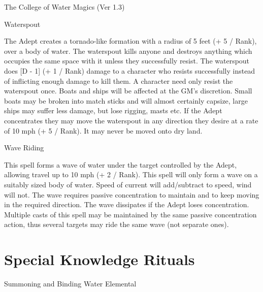 \begin{Chapter}{The College of Water Magics (Ver 1.3)}
\begin{spell}[S-14]{Waterspout}
\begin{effects}
The Adept creates a tornado-like formation with a radius of 5 feet (+
5 / Rank), over a body of water.  The waterspout kills anyone and
destroys anything which occupies the same space with it unless they
successfully resist.  The waterspout does [D - 1] (+ 1 / Rank) damage
to a character who resists successfully instead of inflicting enough
damage to kill them. A character need only resist the waterspout
once. Boats and ships will be affected at the GM’s discretion.  Small
boats may be broken into match sticks and will almost certainly
capsize, large ships may suffer less damage, but lose rigging, masts
etc.  If the Adept concentrates they may move the waterspout in any
direction they desire at a rate of 10 mph (+ 5 / Rank). It may never
be moved onto dry land.
\end{effects}
\end{spell}

\begin{spell}[S-15]{Wave Riding}

\begin{effects}
This spell forms a wave of water under the target controlled by the
Adept, allowing travel up to 10 mph (+ 2 / Rank). This spell will only
form a wave on a suitably sized body of water.  Speed of current will
add/subtract to speed, wind will not.  The wave requires passive
concentration to maintain and to keep moving in the required
direction.  The wave dissipates if the Adept loses concentration.
Multiple casts of this spell may be maintained by the same passive
concentration action, thus several targets may ride the same wave (not
separate ones).
\end{effects}
\end{spell}


\section{Special Knowledge Rituals}

\begin{ritual}[R-1]{Summoning and Binding Water Elemental}


\end{ritual}
\end{Chapter}
